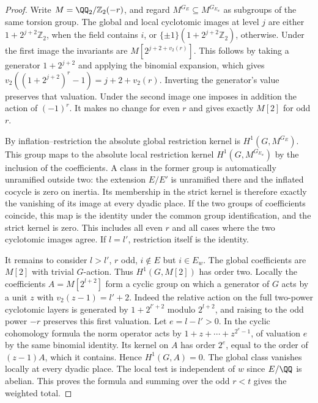 \documentclass[a4paper,11pt]{article}
\theoremstyle{definition}
\theoremstyle{remark}
\newcommand{\ZZ}{\mathbb Z}\newcommand{\ord}{\operatorname{ord}}
\numberwithin{equation}{section}
\begin{document}
\begin{proof}
Write \(M=\QQ_2/\ZZ_2(-r)\), and regard \(M^{G_E}\subseteq M^{G_{E_w}}\)
as subgroups of the same torsion group. The global and local
cyclotomic images at level \(j\) are either \(1+2^{j+2}\ZZ_2\),
when the field contains \(i\), or
\(\{\pm1\}(1+2^{j+2}\ZZ_2)\), otherwise. Under the first image
the invariants are \(M[2^{j+2+v_2(r)}]\). This follows by taking
a generator \(1+2^{j+2}\) and applying the binomial expansion, which
gives \(v_2((1+2^{j+2})^r-1)=j+2+v_2(r)\). Inverting the generator's
value preserves that valuation. Under the second image one imposes
in addition the action of \((-1)^r\). It makes no change for even
\(r\) and gives exactly \(M[2]\) for odd \(r\).

By inflation--restriction the absolute global restriction kernel is
\(H^1(G,M^{G_E})\). This group maps to the absolute local restriction
kernel \(H^1(G,M^{G_{E_w}})\) by the inclusion of the coefficients.
A class in the former group is automatically unramified outside two:
the extension \(E/E'\) is unramified there and the inflated cocycle
is zero on inertia. Its membership in the strict kernel is therefore
exactly the vanishing of its image at every dyadic place. If the two
groups of coefficients coincide, this map is the identity under the
common group identification, and the strict kernel is zero. This
includes all even \(r\) and all cases where the two cyclotomic images
agree. If \(l=l'\), restriction itself is the identity.

It remains to consider \(l>l'\), \(r\) odd, \(i\notin E\) but
\(i\in E_w\). The global coefficients are \(M[2]\) with trivial
\(G\)-action. Thus \(H^1(G,M[2])\) has order two. Locally the
coefficients \(A=M[2^{l+2}]\) form a cyclic group on which a generator
of \(G\) acts by a unit \(z\) with \(v_2(z-1)=l'+2\).
Indeed the relative action on the full two-power cyclotomic layers
is generated by \(1+2^{l'+2}\) modulo \(2^{l+2}\), and raising to
the odd power \(-r\) preserves this first valuation.
Let \(e=l-l'>0\). In the cyclic cohomology formula the norm operator
acts by \(1+z+\cdots+z^{2^e-1}\), of valuation \(e\) by the same
binomial identity. Its kernel on \(A\) has order \(2^e\), equal to
the order of \((z-1)A\), which it contains. Hence \(H^1(G,A)=0\).
The global class vanishes locally at every dyadic place. The local
test is independent of \(w\) since \(E/\QQ\) is abelian. This proves
the formula and summing over the odd \(r<t\) gives the weighted total.
\end{proof}
\end{document}
